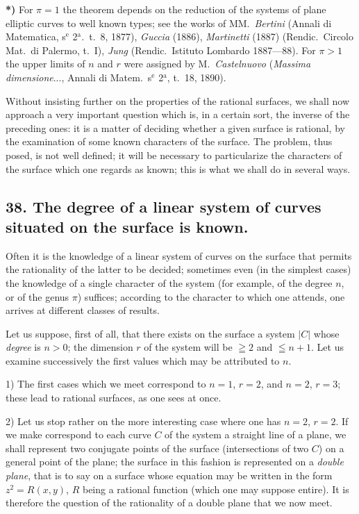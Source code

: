 \documentclass{article}
\begin{document}
\textbf{*)} For $\pi = 1$ the theorem depends on the reduction of the systems of plane elliptic curves to well known types; see the works of MM.\ \emph{Bertini} (Annali di Matematica, s${}^{\text{e}}$ 2${}^{\text{a}}$.\ t.\ 8, 1877), \emph{Guccia} (1886), \emph{Martinetti} (1887) (Rendic.\ Circolo Mat.\ di Palermo, t.\ I), \emph{Jung} (Rendic.\ Istituto Lombardo 1887---88). For $\pi > 1$ the upper limits of $n$ and $r$ were assigned by M.\ \emph{Castelnuovo} (\emph{Massima dimensione}..., Annali di Matem.\ s${}^{\text{e}}$ 2${}^{\text{a}}$, t.\ 18, 1890).


Without insisting further on the properties of the rational surfaces, we shall now approach a very important question which is, in a certain sort, the inverse of the preceding ones: it is a matter of deciding whether a given surface is rational, by the examination of some known characters of the surface. The problem, thus posed, is not well defined; it will be necessary to particularize the characters of the surface which one regards as known; this is what we shall do in several ways.

\subsection*{38. The degree of a linear system of curves situated on the surface is known.}

Often it is the knowledge of a linear system of curves on the surface that permits the rationality of the latter to be decided; sometimes even (in the simplest cases) the knowledge of a single character of the system (for example, of the degree $n$, or of the genus $\pi$) suffices; according to the character to which one attends, one arrives at different classes of results.

Let us suppose, first of all, that there exists on the surface a system $|C|$ whose \emph{degree} is $n > 0$; the dimension $r$ of the system will be $\geqq 2$ and $\leqq n + 1$. Let us examine successively the first values which may be attributed to $n$.

1) The first cases which we meet correspond to $n = 1$, $r = 2$, and $n = 2$, $r = 3$; these lead to rational surfaces, as one sees at once.

2) Let us stop rather on the more interesting case where one has $n = 2$, $r = 2$. If we make correspond to each curve $C$ of the system a straight line of a plane, we shall represent two conjugate points of the surface (intersections of two $C$) on a general point of the plane; the surface in this fashion is represented on a \emph{double plane}, that is to say on a surface whose equation may be written in the form $z^{2} = R(x, y)$, $R$ being a rational function (which one may suppose entire). It is therefore the question of the rationality of a double plane that we now meet.
\end{document}
